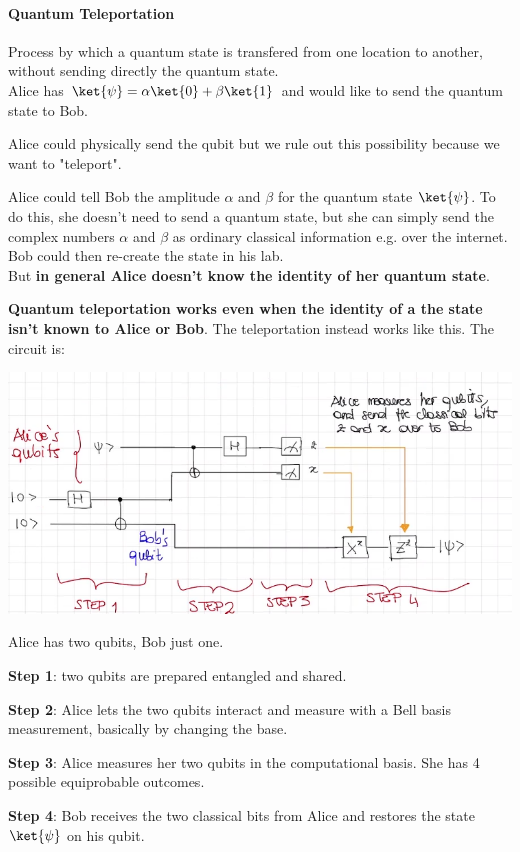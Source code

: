 \documentclass[10pt]{report}
\begin{document}
\paragraph{Quantum Teleportation} Process by which a quantum state is transfered from one location to another, without sending directly the quantum state.\\
Alice has $\ket{\psi} = \alpha\ket{0}+\beta\ket{1}$ and would like to send the quantum state to Bob.\begin{list}{}{}
	\item Alice could physically send the qubit but we rule out this possibility because we want to "teleport".
	\item Alice could tell Bob the amplitude $\alpha$ and $\beta$ for the quantum state $\ket{\psi}$. To do this, she doesn't need to send a quantum state, but she can simply send the complex numbers $\alpha$ and $\beta$ as ordinary classical information e.g. over the internet. Bob could then re-create the state in his lab.\\
	But \textbf{in general Alice doesn't know the identity of her quantum state}.
\end{list}
\textbf{Quantum teleportation works even when the identity of a the state isn't known to Alice or Bob}.
The teleportation instead works like this. The circuit is:
\begin{center}
	\includegraphics[scale=0.5]{17.png}
\end{center}
Alice has two qubits, Bob just one.
\begin{list}{}{}
	\item \textbf{Step 1}: two qubits are prepared entangled and shared.
	\item \textbf{Step 2}: Alice lets the two qubits interact and measure with a Bell basis measurement, basically by changing the base.
	\item \textbf{Step 3}: Alice measures her two qubits in the computational basis. She has 4 possible equiprobable outcomes.
	\item \textbf{Step 4}: Bob receives the two classical bits from Alice and restores the state $\ket{\psi}$ on his qubit.
\end{list}
\end{document}
